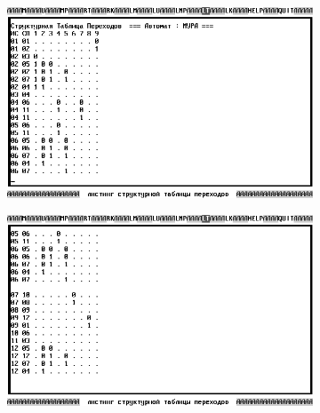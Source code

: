 \documentclass[a4paper,oneside,DIV=12,12pt]{scrartcl}
\begin{document}
\begin{figure}
			\begin{subfigure}[t]{0.5\linewidth-0.8em}
			\centering
				\includegraphics[width = \linewidth]{./assets/02-ris-rus_002-bw.png}
			\caption{}
			\label{subfig:ristpic-structured-jump-table-00}
			\end{subfigure}
			\quad
			\begin{subfigure}[t]{0.5\linewidth-0.8em}
			\centering
				\includegraphics[width = \linewidth]{./assets/03-ris-rus_003-bw.png}
			\caption{}
			\label{subfig:ristpic-structured-jump-table-01}
			\end{subfigure}\vspace*{\floatsep}
			

\end{figure}
\end{document}
